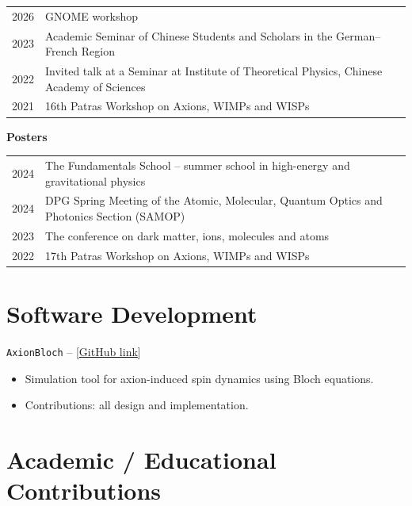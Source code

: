 \vspace{0.3em}

\noindent\begin{tabular}{@{}lp{\dimexpr\linewidth-2.5cm\relax}@{}}
2026 & GNOME workshop \\
2023 & Academic Seminar of Chinese Students and Scholars in the German--French Region \\
2022 & Invited talk at a Seminar at Institute of Theoretical Physics, Chinese Academy of Sciences \\
2021 & 16th Patras Workshop on Axions, WIMPs and WISPs \\
\end{tabular}

\vspace{0.5em}

\noindent\textbf{Posters}

\vspace{0.3em}

\noindent\begin{tabular}{@{}lp{\dimexpr\linewidth-2.5cm\relax}@{}}
2024 & The Fundamentals School -- summer school in high-energy and gravitational physics \\
2024 & DPG Spring Meeting of the Atomic, Molecular, Quantum Optics and Photonics Section (SAMOP) \\
2023 & The conference on dark matter, ions, molecules and atoms \\
2022 & 17th Patras Workshop on Axions, WIMPs and WISPs \\
\end{tabular}

\section*{Software Development}

\texttt{AxionBloch} -- [\href{https://github.com/Yuzhe98/AxionBloch}{GitHub link}]
\begin{itemize}
    \item Simulation tool for axion-induced spin dynamics using Bloch equations.  
    \item Contributions: all design and implementation. 
\end{itemize}

\section*{Academic / Educational Contributions}

